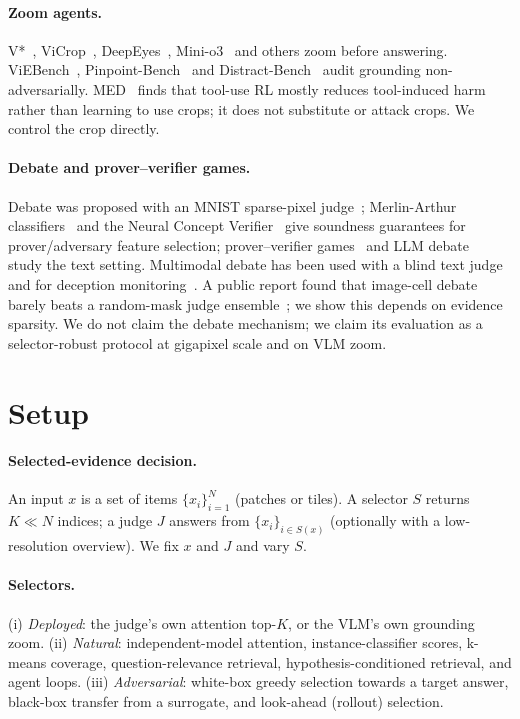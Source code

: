 \documentclass[10pt,twocolumn,letterpaper]{article}
\begin{document}
\paragraph{Zoom agents.} V*~\cite{wu2024vstar}, ViCrop~\cite{zhang2025vicrop}, DeepEyes~\cite{zheng2025deepeyes}, Mini-o3~\cite{minio3} and others zoom before answering. ViEBench~\cite{viebench2026}, Pinpoint-Bench~\cite{pixeleyes2026} and Distract-Bench~\cite{distract2026} audit grounding non-adversarially. MED~\cite{med2026} finds that tool-use RL mostly reduces tool-induced harm rather than learning to use crops; it does not substitute or attack crops. We control the crop directly.
\paragraph{Debate and prover--verifier games.} Debate was proposed with an MNIST sparse-pixel judge~\cite{irving2018debate}; Merlin-Arthur classifiers~\cite{waldchen2024merlin} and the Neural Concept Verifier~\cite{ncv2026} give soundness guarantees for prover/adversary feature selection; prover--verifier games~\cite{anil2021pvg,kirchner2024pvg,hammond2025nip} and LLM debate~\cite{khan2024debate,kenton2024scalable} study the text setting. Multimodal debate has been used with a blind text judge~\cite{adhikari2025debating} and for deception monitoring~\cite{fang2026debateimages}. A public report found that image-cell debate barely beats a random-mask judge ensemble~\cite{quantilized_debate}; we show this depends on evidence sparsity. We do not claim the debate mechanism; we claim its evaluation as a selector-robust protocol at gigapixel scale and on VLM zoom.

\section{Setup}\label{sec:setup}
\paragraph{Selected-evidence decision.} An input $x$ is a set of items $\{x_i\}_{i=1}^N$ (patches or tiles). A selector $S$ returns $K\!\ll\!N$ indices; a judge $J$ answers from $\{x_i\}_{i\in S(x)}$ (optionally with a low-resolution overview). We fix $x$ and $J$ and vary $S$.
\paragraph{Selectors.} (i) \emph{Deployed}: the judge's own attention top-$K$, or the VLM's own grounding zoom. (ii) \emph{Natural}: independent-model attention, instance-classifier scores, k-means coverage, question-relevance retrieval, hypothesis-conditioned retrieval, and agent loops. (iii) \emph{Adversarial}: white-box greedy selection towards a target answer, black-box transfer from a surrogate, and look-ahead (rollout) selection.
\end{document}
